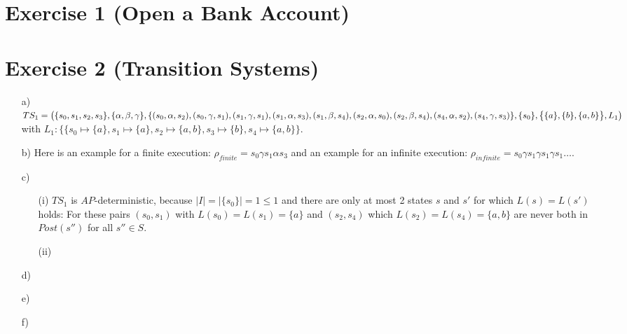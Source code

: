 \documentclass[a4paper,11pt]{scrartcl}
\begin{document}
	
	\section*{Exercise 1 (Open a Bank Account)}
	
	
	\section*{Exercise 2 (Transition Systems)}
	
	\begin{itemize}
		\item[a)] $ TS_1 = \bigl( \{s_0, s_1, s_2, s_3\}, \{\alpha,\beta, \gamma\}, \\
		\{ (s_0, \alpha, s_2), (s_0, \gamma, s_1), (s_1, \gamma, s_1), (s_1, \alpha, s_3), (s_1, \beta, s_4), (s_2, \alpha, s_0), (s_2, \beta, s_4), (s_4, \alpha, s_2), (s_4, \gamma, s_3)\},\\
		\{s_0\}, \bigl\{ \{a\}, \{b\}, \{a,b\} \bigr\}, L_1 \bigr)$\\
		with $L_1: \bigl\{ \{s_0 \mapsto \{a\}, s_1 \mapsto \{a\}, s_2 \mapsto \{a,b\}, s_3 \mapsto \{b\}, s_4 \mapsto \{a,b\} \bigr\}$.
		\item[b)] Here is an example for a finite execution: $\rho_{finite} = s_0 \gamma s_1 \alpha s_3$ and an example for an infinite execution: $\rho_{infinite} = s_0 \gamma s_1 \gamma s_1 \gamma s_1 \dots$.
		\item[c)]
		\begin{itemize}
			\item[(i)] $TS_1$ is $AP$-deterministic, because $\mid I \mid = \mid \{s_0\} \mid = 1 \leq 1$ and there are only at most 2 states $s$ and $s'$ for which $L(s)=L(s')$ holds: For these pairs $(s_0, s_1)$ with $L(s_0)=L(s_1)=\{a\}$ and $(s_2, s_4)$ which $L(s_2)=L(s_4)=\{a, b\}$ are never both in $Post(s'')$ for all $s'' \in S$.
			
			
			\item[(ii)]
		\end{itemize}
		\item[d)]
		\item[e)]
		\item[f)]
	\end{itemize}
	
\end{document}
